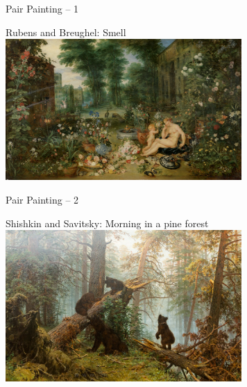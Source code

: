\documentclass{beamer}
\begin{document}
\begin{frame}
{\centerline{Pair Painting -- 1}}

\begin{center}
Rubens and Breughel: Smell\\ 
\vspace{0.3cm}
\includegraphics[width=9cm]{P2023.AIBCCSS.Drawing/rub_and_br.jpg}
\end{center}

\end{frame}

\begin{frame}
{\centerline{Pair Painting -- 2}}

\begin{center}
Shishkin and Savitsky: Morning in a pine forest\\ 
\vspace{0.3cm}
\includegraphics[width=9cm]{P2023.AIBCCSS.Drawing/shish.jpg}
\end{center}

\end{frame}
\end{document}
